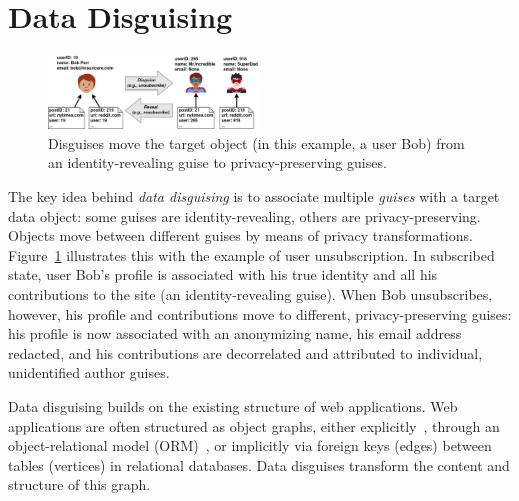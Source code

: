 \section{Data Disguising}
\begin{figure}[t!]
    \centering
    \includegraphics[width=0.5\textwidth]{img/disguises_design}

    \caption{Disguises move the target object (in this example, a user Bob) from an identity-revealing
    guise to privacy-preserving guises.}
    \label{fig:example}
\end{figure}


%
The key idea behind \emph{data disguising} is to associate multiple \emph{guises} with a target
data object: some guises are identity-revealing, others are privacy-preserving.
%
Objects move between different guises by means of privacy transformations.
%
Figure~\ref{fig:example} illustrates this with the example of user unsubscription.
%
In subscribed state, user Bob's profile is associated with his true identity and all his
contributions to the site (an identity-revealing guise).
%
When Bob unsubscribes, however, his profile and contributions move to different,
privacy-preserving guises: his profile is now associated with an anonymizing name, his email
address redacted, and his contributions are decorrelated and attributed to individual,
unidentified author guises.
%

%
Data disguising builds on the existing structure of web applications.
%
Web applications are often structured as object graphs, either explicitly~\cite{tao, delf},
through an object-relational model (ORM)~\cite{orm}, or implicitly via foreign keys (edges)
between tables (vertices) in relational databases.
%
Data disguises transform the content and structure of this graph.
%

